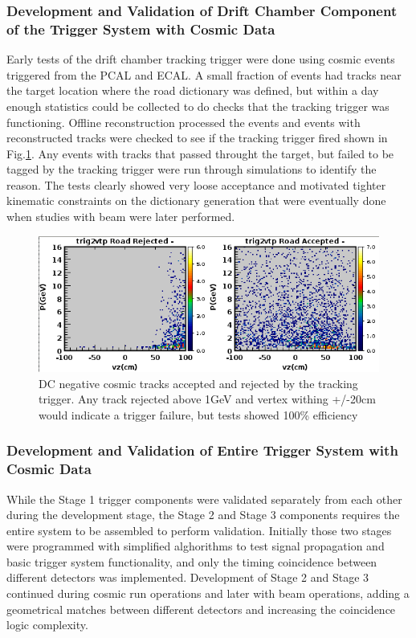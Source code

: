 \subsubsection{Development and Validation of Drift Chamber Component of the Trigger System with Cosmic Data}

Early tests of the drift chamber tracking trigger were done using cosmic events triggered from the PCAL and ECAL. A small fraction of events had tracks near the target location where the road dictionary was defined, but within a day enough statistics could be collected to do checks that the tracking trigger was functioning. Offline reconstruction processed the events and events with reconstructed tracks were checked to see if the tracking trigger fired shown in Fig.\ref{fig:dc_cosmic_efficiency}. Any events with tracks that passed throught the target, but failed to be tagged by the tracking trigger were run through simulations to identify the reason. The tests clearly showed very loose acceptance and motivated tighter kinematic constraints on the dictionary generation that were eventually done when studies with beam were later performed.

\begin{figure}[!htb]
 	\centering
  	\includegraphics[width=1.0\columnwidth,keepaspectratio]{img/dc_cosmic_efficiency.png}
 	\caption{DC negative cosmic tracks accepted and rejected by the tracking trigger. Any track rejected above 1GeV and vertex withing +/-20cm would indicate a trigger failure, but tests showed 100\% efficiency}
	\label{fig:dc_cosmic_efficiency}
\end{figure}


\subsubsection{Development and Validation of Entire Trigger System with Cosmic Data} 

While the Stage 1 trigger components were validated separately from each other during the development stage, the Stage 2 and Stage 3 components requires the entire system to be assembled to perform validation. Initially those two stages were programmed with simplified alghorithms to test signal propagation and basic trigger system functionality, and only the timing coincidence between different detectors was implemented. Development of Stage 2 and Stage 3 continued during cosmic run operations and later with beam operations, adding a geometrical matches between different detectors and increasing the coincidence logic complexity.


